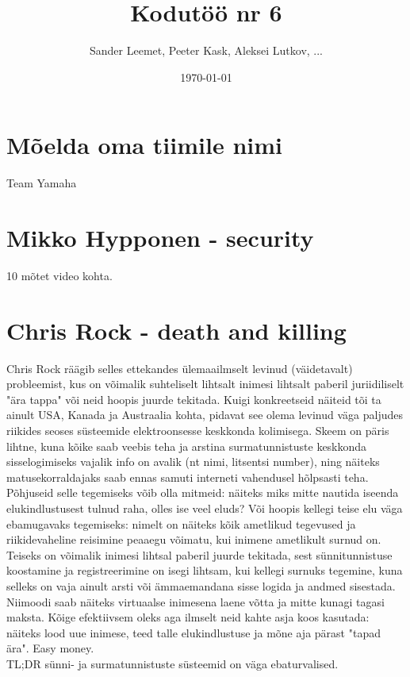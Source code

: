 \documentclass{article}
\title{Kodutöö nr 6}
\author{Sander Leemet, Peeter Kask, Aleksei Lutkov, ...}
\date{\today}
\begin{document}
\maketitle

\section{Mõelda oma tiimile nimi}
Team Yamaha

\section{Mikko Hypponen - security}
10 mõtet video kohta.

\section{Chris Rock - death and killing}
Chris Rock räägib selles ettekandes ülemaailmselt levinud (väidetavalt) probleemist, kus on võimalik suhteliselt lihtsalt inimesi lihtsalt paberil juriidiliselt "ära tappa" või neid hoopis juurde tekitada. Kuigi konkreetseid näiteid tõi ta ainult USA, Kanada ja Austraalia kohta, pidavat see olema levinud väga paljudes riikides seoses süsteemide elektroonsesse keskkonda kolimisega. Skeem on päris lihtne, kuna kõike saab veebis teha ja arstina surmatunnistuste keskkonda sisselogimiseks vajalik info on avalik (nt nimi, litsentsi number), ning näiteks matusekorraldajaks saab ennas samuti interneti vahendusel hõlpsasti teha. Põhjuseid selle tegemiseks võib olla mitmeid: näiteks miks mitte nautida iseenda elukindlustusest tulnud raha, olles ise veel eluds? Või hoopis kellegi teise elu väga ebamugavaks tegemiseks: nimelt on näiteks kõik ametlikud tegevused ja riikidevaheline reisimine peaaegu võimatu, kui inimene ametlikult surnud on. Teiseks on võimalik inimesi lihtsal paberil juurde tekitada, sest sünnitunnistuse koostamine ja registreerimine on isegi lihtsam, kui kellegi surnuks tegemine, kuna selleks on vaja ainult arsti või ämmaemandana sisse logida ja andmed sisestada. Niimoodi saab näiteks virtuaalse inimesena laene võtta ja mitte kunagi tagasi maksta. Kõige efektiivsem oleks aga ilmselt neid kahte asja koos kasutada: näiteks lood uue inimese, teed talle elukindlustuse ja mõne aja pärast "tapad ära". Easy money.\\
TL;DR sünni- ja surmatunnistuste süsteemid on väga ebaturvalised.
\end{document}
